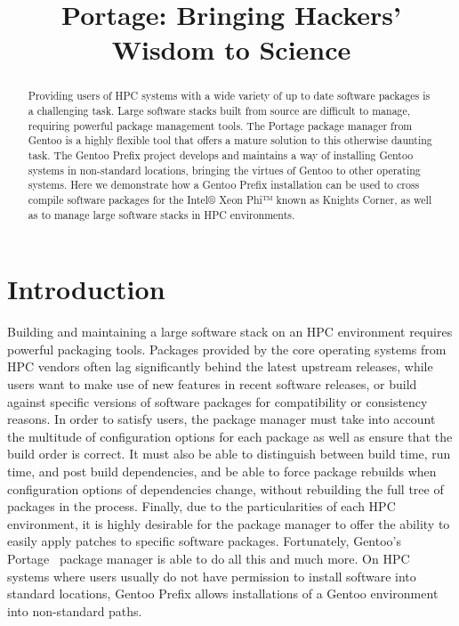 \documentclass[a4paper,conference]{IEEEtran}
\title{Portage: Bringing Hackers' Wisdom to Science}
\author{
  \IEEEauthorblockN{Guilherme Amadio}
  \IEEEauthorblockA{São Paulo State University, Brazil\\
                    Gentoo Linux\\amadio@gentoo.org}
  \and
  \IEEEauthorblockN{Benda Xu}
  \IEEEauthorblockA{The University of Tokyo, Japan\\
                    Gentoo Linux\\heroxbd@gentoo.org}
}
\begin{document}
\maketitle

\begin{abstract}

Providing users of HPC systems with a wide variety of up to date software
packages is a challenging task. Large software stacks built from source
are difficult to manage, requiring powerful package management tools.
The Portage package manager from Gentoo is a highly flexible tool that
offers a mature solution to this otherwise daunting task. The Gentoo
Prefix project develops and maintains a way of installing Gentoo systems
in non-standard locations, bringing the virtues of Gentoo to other
operating systems. Here we demonstrate how a Gentoo Prefix
installation can be used to cross compile software packages for the
Intel® Xeon Phi™ known as Knights Corner, as well as to manage large
software stacks in HPC environments.

\end{abstract}

\section{Introduction}

Building and maintaining a large software stack on an HPC environment
requires powerful packaging tools. Packages provided by the core operating
systems from HPC vendors often lag significantly behind the latest
upstream releases, while users want to make use of new features in
recent software releases, or build against specific versions of software
packages for compatibility or consistency reasons. In order to satisfy
users, the package manager must take into account the multitude of
configuration options for each package as well as ensure that the build
order is correct. It must also be able to distinguish between build
time, run time, and post build dependencies, and be able to force
package rebuilds when configuration options of dependencies change,
without rebuilding the full tree of packages in the process. Finally,
due to the particularities of each HPC environment, it is highly
desirable for the package manager to offer the ability to easily apply
patches to specific software packages. Fortunately,
Gentoo's~\cite{gentoo} Portage~\cite{gentoo:portage} package manager is
able to do all this and much more. On HPC systems where users usually do
not have permission to install software into standard locations, Gentoo
Prefix \cite{gentoo:prefix} allows installations of a Gentoo environment
into non-standard paths.
\end{document}
